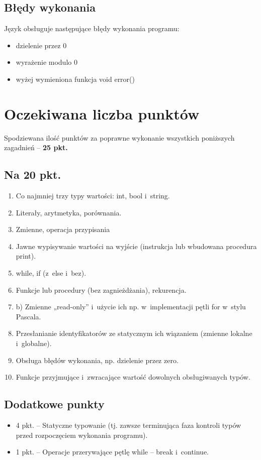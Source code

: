 \documentclass{article}
\begin{document}
\subsection{Błędy wykonania}
Język obsługuje następujące błędy wykonania programu:
\begin{itemize}
    \item dzielenie przez 0
    \item wyrażenie modulo 0
    \item wyżej wymieniona funkcja void error()
\end{itemize}

\newpage
\section{Oczekiwana liczba punktów}
Spodziewana ilość punktów za poprawne wykonanie wszystkich poniższych zagadnień -- \textbf{25 pkt.}

\subsection{Na 20 pkt.}
\begin{enumerate}
    \item Co najmniej trzy typy wartości: int, bool i~string.
    \item Literały, arytmetyka, porównania.
    \item Zmienne, operacja przypisania
    \item Jawne wypisywanie wartości na wyjście (instrukcja lub wbudowana procedura print).
    \item while, if (z~else i~bez).
    \item Funkcje lub procedury (bez zagnieżdżania), rekurencja.
    \item b) Zmienne „read-only” i~użycie ich np. w~implementacji pętli for w~stylu Pascala.
    \item Przesłanianie identyfikatorów ze statycznym ich wiązaniem (zmienne lokalne i~globalne).
    \item Obsługa błędów wykonania, np. dzielenie przez zero.
    \item Funkcje przyjmujące i~zwracające wartość dowolnych obsługiwanych typów.
\end{enumerate}

\subsection{Dodatkowe punkty}
\begin{itemize}
    \item 4 pkt. -- Statyczne typowanie (tj. zawsze terminująca faza 
    kontroli typów przed rozpoczęciem wykonania programu).
    \item 1 pkt. -- Operacje przerywające pętlę while -- break i~continue.
\end{itemize}
\end{document}
